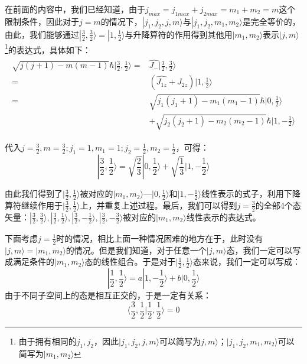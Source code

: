 在前面的内容中，我们已经知道，由于$j_{max}=j_{1max}+j_{2max}=m_1+m_2=m$这个限制条件，因此对于$j=m$的情况下，$|j_1,j_2,j,m\rangle\textrm{与}|j_1,j_2,m_1,m_2\rangle$是完全等价的，由此，我们能够通过$|\frac{3}{2},\frac{3}{2}\rangle=|1,\frac{1}{2}\rangle$与升降算符的作用得到其他用$|m_1,m_2\rangle$表示$|j,m\rangle$\footnote{由于拥有相同的$j_1,j_2$，因此$|j_1,j_2,j,m\rangle$可以简写为$j,m\rangle$；$|j_1,j_2,m_1,m_2\rangle$可以简写为$|m_1,m_2\rangle$}的表达式，具体如下：
\begin{align}
    \begin{split}
        \sqrt{j(j+1)-m(m-1)}\hbar|\frac{3}{2},\frac{1}{2}\rangle=&\hat{J_-}|\frac{3}{2},\frac{3}{2}\rangle\\
        =&(\widehat{J_{1z}}+\widehat{J_{2z}})|1,\frac{1}{2}\rangle\\
        =&\sqrt{j_1(j_1+1)-m_1(m_1-1)}\hbar|0,\frac{1}{2}\rangle\\
        &+\sqrt{j_2(j_2+1)-m_2(m_2-1)}\hbar|1,-\frac{1}{2}\rangle
    \end{split}
\end{align}

代入$j=\frac{3}{2},m=\frac{3}{2};j_1=1,m_1=1;j_2=\frac{1}{2},m_2=\frac{1}{2}$，可得：
\begin{equation}\label{equ5:down}
    |\frac{3}{2},\frac{1}{2}\rangle=\sqrt{\frac{2}{3}}|0,\frac{1}{2}\rangle+\sqrt{\frac{1}{3}}|1,-\frac{1}{2}\rangle
\end{equation}

由此我们得到了$|\frac{3}{2},\frac{1}{2}\rangle$被对应的$|m_1,m_2\rangle$---$|0,\frac{1}{2}\rangle$和$|1,-\frac{1}{2}\rangle$线性表示的式子，利用下降算符继续作用于$|\frac{3}{2},\frac{1}{2}\rangle$上，并重复上述过程。最后，我们可以得到$j=\frac{3}{2}$的全部4个态矢量：$|\frac{3}{2},\frac{3}{2}\rangle,|\frac{3}{2},\frac{1}{2}\rangle,|\frac{3}{2},-\frac{1}{2}\rangle,|\frac{3}{2},-\frac{3}{2}\rangle$被对应的$|m_1,m_2\rangle$线性表示的表达式。

下面考虑$j=\frac{1}{2}$时的情况，相比上面一种情况困难的地方在于，此时没有$|j,m\rangle=|m_1,m_2\rangle$的情况。但是我们知道，对于任意一个$|j,m\rangle$态，我们一定可以写成满足条件的$|m_1,m_2\rangle$态的线性组合。于是对于$|\frac{1}{2},\frac{1}{2}\rangle$态来说，我们一定可以写成：
\begin{equation}
    |\frac{1}{2},\frac{1}{2}\rangle=a|1,-\frac{1}{2}\rangle+b|0,\frac{1}{2}\rangle
\end{equation}
由于不同子空间上的态是相互正交的，于是一定有关系：
\begin{equation}
    \langle \frac{3}{2},\frac{1}{2}|\frac{1}{2},\frac{1}{2}\rangle=0
\end{equation}

